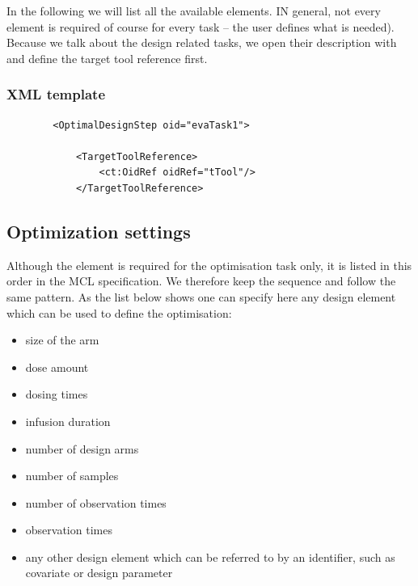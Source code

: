 In the following we will list all the available elements. IN general, not every 
element is required of course for every task -- the user defines what is 
needed). Because we talk about the design related tasks, we open their 
description with  and define the target tool reference 
first.

\subsubsection{XML template}
\lstset{language=XML}
\begin{lstlisting}
        <OptimalDesignStep oid="evaTask1">
            
            <TargetToolReference>
                <ct:OidRef oidRef="tTool"/>
            </TargetToolReference>
\end{lstlisting}


\subsection{Optimization settings}
Although the  element is required for the optimisation task only, 
it is listed in this order in the MCL specification. We therefore keep the sequence 
and follow the same pattern. As the list below shows one can specify here 
any design element which can be used to define the optimisation:
\begin{itemize}
\item 
size of the arm 
\item  
dose amount
\item 
dosing times
\item 
infusion duration
\item 
number of design arms
\item 
number of samples
\item 
number of observation times
\item 
observation times
\item 
any other design element which can be referred to by an identifier, such as covariate or design parameter
\end{itemize}

